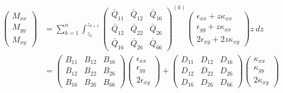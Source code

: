 \begin{gather} 
	\begin{aligned}
		\begin{pmatrix}
			M_{xx} \\
			M_{yy} \\
			M_{xy} 
		\end{pmatrix} 
		& = 
		\sum_{k=1}^n
		\int_{z_k}^{z_{k+1}}
		{\begin{pmatrix}
				\bar{Q}_{11} & \bar{Q}_{12} &  \bar{Q}_{16} \\
				\bar{Q}_{12} & \bar{Q}_{22} &  \bar{Q}_{26} \\
				\bar{Q}_{16} & \bar{Q}_{26} & \bar{Q}_{66} 
		\end{pmatrix}}^{(k)}
		\begin{pmatrix}
			\epsilon_{xx} + z \kappa_{xx}\\
			\epsilon_{yy} + z \kappa_{xx}\\
			2\epsilon_{xy} + 2z\kappa_{xy}
		\end{pmatrix}
		z\ dz \\
		& =
		\begin{pmatrix}
			{B}_{11} & {B}_{12} &  {B}_{16} \\
			{B}_{12} & {B}_{22} &  {B}_{26} \\
			{B}_{16} & {B}_{26} & {B}_{66} 
		\end{pmatrix}
		\begin{pmatrix}
			\epsilon_{xx}\\
			\epsilon_{yy}\\
			2\epsilon_{xy}
		\end{pmatrix}
		+
		\begin{pmatrix}
			{D}_{11} & {D}_{12} &  {D}_{16} \\
			{D}_{12} & {D}_{22} &  {D}_{26} \\
			{D}_{16} & {D}_{26} & {D}_{66} 
		\end{pmatrix}
		\begin{pmatrix}
			\kappa_{xx}\\
			\kappa_{yy}\\
			2\kappa_{xy}
		\end{pmatrix}
		\label{eqscomp_laminate_constitutive4}
	\end{aligned}
\end{gather}
